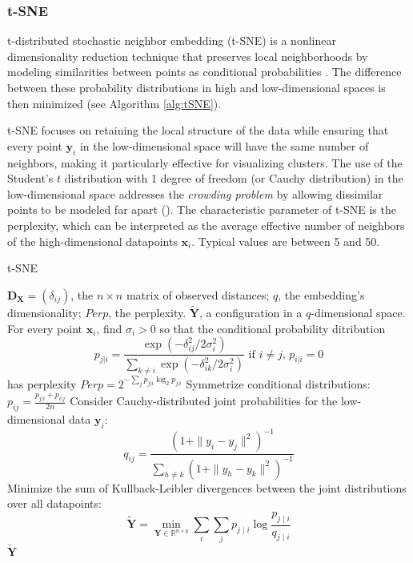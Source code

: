 \subsubsection{t-SNE}

t-distributed stochastic neighbor embedding (t-SNE) is a nonlinear dimensionality reduction technique that preserves local neighborhoods by modeling similarities between points as conditional probabilities \citep{Vandermaaten2008}. The difference between these probability distributions in high and low-dimensional spaces is then minimized (see Algorithm \ref{alg:tSNE}).

t-SNE focuses on retaining the local structure of the data while ensuring that every point $\mathbf{y}_i$ in the low-dimensional space will have the same number of neighbors, making it particularly effective for visualizing clusters. The use of the Student's $t$ distribution with 1 degree of freedom (or Cauchy distribution) in the low-dimensional space addresses the \textit{crowding problem} by allowing dissimilar points to be modeled far apart (\cite{Vandermaaten2008}). The characteristic parameter of t-SNE is the perplexity, which can be interpreted as the average effective number of neighbors of the high-dimensional datapoints $\mathbf{x}_i$. Typical values are between 5 and 50.

\begin{algorithm}[ht]
    \caption{t-SNE}
    \label{alg:tSNE}
    
    \begin{algorithmic}[1]
    \REQUIRE $\mathbf{D_X} = (\delta_{ij})$, the $n \times n$ matrix of observed distances; $q$, the embedding's dimensionality; $Perp$, the perplexity.
    \ENSURE $\mathbf{\tilde{Y}}$, a configuration in a $q$-dimensional space.
    \STATE For every point $\mathbf{x}_i$, find $\sigma_i > 0$ so that the conditional probability ditribution
        $$
        p_{j|i} = \frac{\exp(-\delta_{ij}^2/2\sigma_i^2)}{\sum_{k \neq i}\exp(-\delta_{ik}^2/2\sigma_i^2)}\text{ if } i \neq j, \, p_{i|i} = 0
        $$ has perplexity $ Perp = 2^{-\sum_{j} p_{j|i} \log_2 p_{j|i}} $
    \STATE Symmetrize conditional distributions: $p_{ij} = \frac{p_{j|i} + p_{i|j}}{2n}$
    \STATE Consider Cauchy-distributed joint probabilities for the low-dimensional data $\mathbf{y}_i$: $$q_{ij} = \frac{(1 + \|y_i-y_j\|^2)^{-1}}{\sum_{h \neq k}(1 + \|y_h-y_k\|^2)^{-1}}$$
    \STATE Minimize the sum of Kullback-Leibler divergences between the joint distributions over all datapoints: $$
    \mathbf{\tilde{Y}} = \min_{\mathbf{Y} \in \mathbb{R}^{n\times q}} \sum_i \sum_j p_{j \mid i} \log \frac{p_{j \mid i}}{q_{j \mid i}}
    $$
    \RETURN $\mathbf{\tilde{Y}}$
    
    \end{algorithmic}
\end{algorithm}

